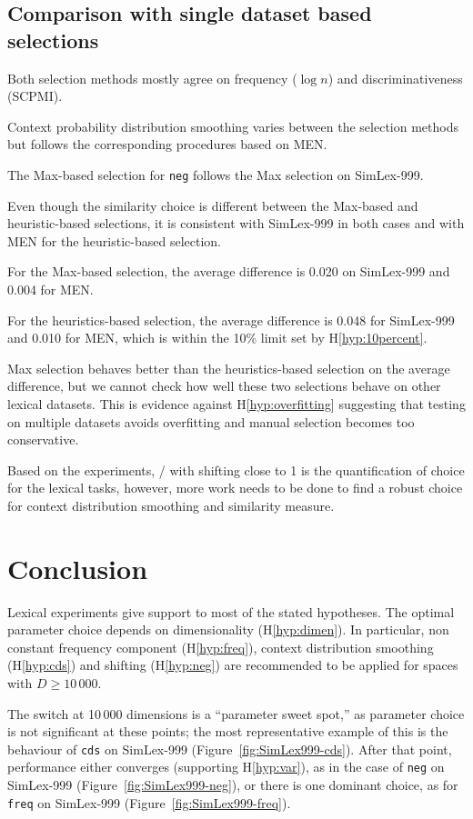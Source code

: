 \subsection{Comparison with single dataset based selections}

Both selection methods mostly agree on frequency ($\log n$) and discriminativeness (SCPMI).

Context probability distribution smoothing varies between the selection methods but follows the corresponding procedures based on MEN.

The Max-based selection for \texttt{neg} follows the Max selection on SimLex-999.

Even though the similarity choice is different between the Max-based and heuristic-based selections, it is consistent with SimLex-999 in both cases and with MEN for the heuristic-based selection.

For the Max-based selection, the average difference is 0.020 on SimLex-999 and 0.004 for MEN.

For the heuristics-based selection, the average difference is 0.048 for SimLex-999 and 0.010 for MEN, which is within the 10\% limit set by H\ref{hyp:10percent}.

Max selection behaves better than the heuristics-based selection on the average difference, but we cannot check how well these two selections behave on other lexical datasets. This is evidence against H\ref{hyp:overfitting} suggesting that testing on multiple datasets avoids overfitting and manual selection becomes too conservative.

Based on the experiments, \logNSCPMI/ with shifting close to 1 is the quantification of choice for the lexical tasks, however, more work needs to be done to find a robust choice for context distribution smoothing and similarity measure.

\section{Conclusion}
\label{sec:conclusion-lexical}

Lexical experiments give support to most of the stated hypotheses. The optimal parameter choice depends on dimensionality (H\ref{hyp:dimen}). In particular, non constant frequency component (H\ref{hyp:freq}), context distribution smoothing (H\ref{hyp:cds}) and shifting (H\ref{hyp:neg}) are recommended to be applied for spaces with $D \geq 10\,000$.

The switch at 10\,000 dimensions is a ``parameter sweet spot,'' as parameter choice is not significant at these points; the most representative example of this is the behaviour of \texttt{cds} on SimLex-999 (Figure~\ref{fig:SimLex999-cds}). After that point, performance either converges (supporting H\ref{hyp:var}), as in the case of \texttt{neg} on SimLex-999 (Figure~\ref{fig:SimLex999-neg}), or there is one dominant choice, as for \texttt{freq} on SimLex-999 (Figure~\ref{fig:SimLex999-freq}).

